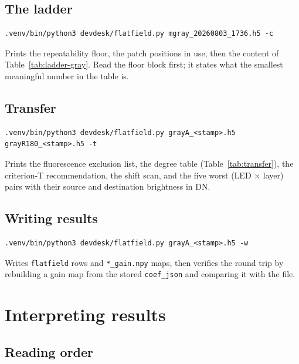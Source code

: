\documentclass[11pt, a4paper]{article}
\newcommand{\code}[1]{\texttt{#1}}
\begin{document}
\subsection{The ladder}

\begin{verbatim}
.venv/bin/python3 devdesk/flatfield.py mgray_20260803_1736.h5 -c
\end{verbatim}

Prints the repeatability floor,
the patch positions in use,
then the content of Table~\ref{tab:ladder-gray}.
Read the floor block first;
it states what the smallest meaningful number in the table is.

\subsection{Transfer}

\begin{verbatim}
.venv/bin/python3 devdesk/flatfield.py grayA_<stamp>.h5 grayR180_<stamp>.h5 -t
\end{verbatim}

Prints the fluorescence exclusion list,
the degree table (Table~\ref{tab:transfer}),
the criterion-T recommendation,
the shift scan,
and the five worst (LED $\times$ layer) pairs
with their source and destination brightness in DN.

\subsection{Writing results}

\begin{verbatim}
.venv/bin/python3 devdesk/flatfield.py grayA_<stamp>.h5 -w
\end{verbatim}

Writes \code{flatfield} rows and \code{*\_gain.npy} maps,
then verifies the round trip
by rebuilding a gain map from the stored \code{coef\_json}
and comparing it with the file.

\section{Interpreting results}
\label{sec:interpreting}

\subsection{Reading order}
\end{document}
